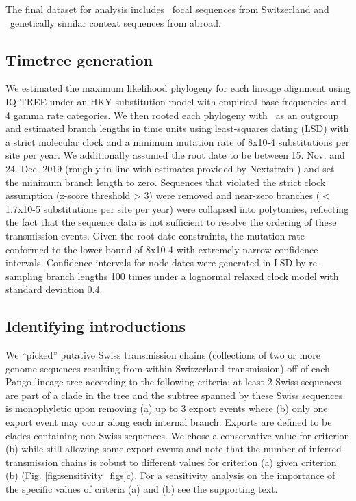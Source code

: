 \documentclass[9pt,twoside,lineno]{pnas-new} %
\begin{document}
The final dataset for analysis includes \nfocalsamples\ focal sequences from Switzerland and \nsimcontext\ genetically similar context sequences from abroad.

\subsection*{Timetree generation}
We estimated the maximum likelihood phylogeny for each lineage alignment using IQ-TREE \cite{Nguyen2014} under an HKY substitution model \cite{Hasegawa1985} with empirical base frequencies and 4 gamma rate categories. We then rooted each phylogeny with \outgroupgisaidepiisls\ as an outgroup and estimated branch lengths in time units using least-squares dating (LSD) \cite{To2016} with a strict molecular clock and a minimum mutation rate of 8x10-4 substitutions per site per year. We additionally assumed the root date to be between 15. Nov. and 24. Dec. 2019 (roughly in line with estimates provided by Nextstrain \cite{Nextstrainteam}) and set the minimum branch length to zero. Sequences that violated the strict clock assumption (z-score threshold > 3) were removed and near-zero branches ($<$1.7x10-5 substitutions per site per year) were collapsed into polytomies, reflecting the fact that the sequence data is not sufficient to resolve the ordering of these transmission events. Given the root date constraints, the mutation rate conformed to the lower bound of 8x10-4 with extremely narrow confidence intervals. Confidence intervals for node dates were generated in LSD by re- sampling branch lengths 100 times under a lognormal relaxed clock model with standard deviation 0.4.

\subsection*{Identifying introductions}
We ``picked'' putative Swiss transmission chains (collections of two or more genome sequences resulting from within-Switzerland transmission) off of each Pango lineage tree according to the following criteria: at least 2 Swiss sequences are part of a clade in the tree and the subtree spanned by these Swiss sequences is monophyletic upon removing (a) up to 3 export events where (b) only one export event may occur along each internal branch. Exports are defined to be clades containing non-Swiss sequences. We chose a conservative value for criterion (b) while still allowing some export events and note that the number of inferred transmission chains is robust to different values for criterion (a) given criterion (b) (Fig. \ref{fig:sensitivity_figs}c). For a sensitivity analysis on the importance of the specific values of criteria (a) and (b) see the supporting text.
\end{document}

